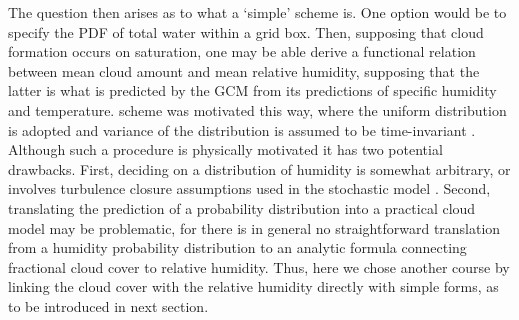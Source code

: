 The question then arises as to what a `simple' scheme is. One option would be to specify the PDF of total water within a grid box. Then, supposing that cloud formation occurs on saturation, one may be able derive a functional relation between mean cloud amount and mean relative humidity, supposing that the latter is what is predicted by the GCM from its predictions of specific humidity and temperature. \citet{Sundqvist1989} scheme was motivated this way, where the uniform distribution is adopted and variance of the distribution is assumed to be time-invariant \citep{Tompkins2005}. Although such a procedure is physically motivated it has two potential drawbacks. First, deciding on a distribution of humidity is somewhat arbitrary, or involves turbulence closure assumptions used in the stochastic model \citep{Sommeria1977,Tsang2018}. Second, translating the prediction of a probability distribution into a practical cloud model may be problematic, for there is in general no straightforward translation from a humidity probability distribution to an analytic formula connecting fractional cloud cover to relative humidity. Thus, here we chose another course by linking the cloud cover with the relative humidity directly with simple forms, as to be introduced in next section.



